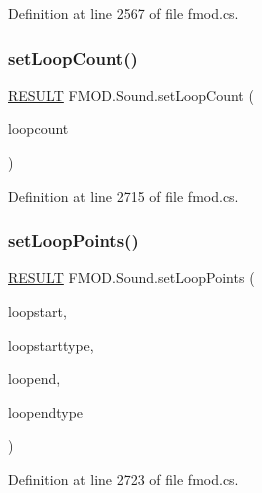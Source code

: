 Definition at line 2567 of file fmod.\+cs.

\mbox{\label{class_f_m_o_d_1_1_sound_a8cd754abc2f3288bf9a8af077e36b0af}} 
\subsubsection{\texorpdfstring{set\+Loop\+Count()}{setLoopCount()}}
{\footnotesize\ttfamily \hyperlink{namespace_f_m_o_d_a305d1176ef3f8c8815861a60407ac33d}{R\+E\+S\+U\+LT} F\+M\+O\+D.\+Sound.\+set\+Loop\+Count (\begin{DoxyParamCaption}\item[{int}]{loopcount }\end{DoxyParamCaption})}



Definition at line 2715 of file fmod.\+cs.

\mbox{\label{class_f_m_o_d_1_1_sound_a86a63f41cba14bdac8de37909ea5024f}} 
\subsubsection{\texorpdfstring{set\+Loop\+Points()}{setLoopPoints()}}
{\footnotesize\ttfamily \hyperlink{namespace_f_m_o_d_a305d1176ef3f8c8815861a60407ac33d}{R\+E\+S\+U\+LT} F\+M\+O\+D.\+Sound.\+set\+Loop\+Points (\begin{DoxyParamCaption}\item[{uint}]{loopstart,  }\item[{\hyperlink{namespace_f_m_o_d_aff20975332f93ff2180d2681cb43929f}{T\+I\+M\+E\+U\+N\+IT}}]{loopstarttype,  }\item[{uint}]{loopend,  }\item[{\hyperlink{namespace_f_m_o_d_aff20975332f93ff2180d2681cb43929f}{T\+I\+M\+E\+U\+N\+IT}}]{loopendtype }\end{DoxyParamCaption})}



Definition at line 2723 of file fmod.\+cs.

\mbox{\label{class_f_m_o_d_1_1_sound_a21c5e81309ef0cc5e0ce8410a680fcc3}} 
